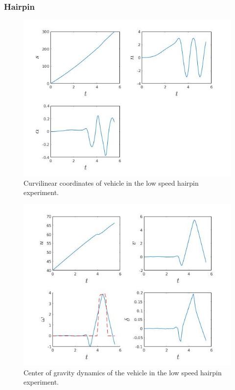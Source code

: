 \documentclass[conference,11pt]{IEEEtran}
\begin{document}
\subsubsection{Hairpin}
\begin{figure}[t]
  \centering
  \includegraphics[scale=0.5]{hairpin_lift_curv.jpg}
  \caption{Curvilinear coordinates of vehicle in the low speed hairpin experiment.}
  \label{fig:hpcurv1}
\end{figure}
\begin{figure}[t]
  \centering
  \includegraphics[scale=0.5]{hairpin_lift_cg.jpg}
  \caption{Center of gravity dynamics of the vehicle in the low speed hairpin experiment.}
  \label{fig:hpcg1}
\end{figure}
\end{document}
